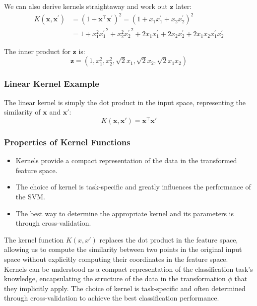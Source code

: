 We can also derive kernels straightaway and work out $\textbf{z}$ later:
\begin{align*}  K(\mathbf{x},\mathbf{x}^{\prime})& =(1+\mathbf{x}^\top\mathbf{x}^\prime)^2=(1+x_1x_1^\prime+x_2x_2^\prime)^2  \\
&=1+x_1^2{x_1^{\prime}}^2+x_2^2{x_2^{\prime}}^2+2x_1x_1^{\prime}+2x_2x_2^{\prime}+2x_1x_2x_1^{\prime}x_2^{\prime}
\end{align*}

The inner product for $\textbf{z}$ is:
\begin{equation*}
    \mathbf{z} = (1, x_1^2, x_2^2, \sqrt{2}x_1, \sqrt{2}x_2, \sqrt{2}x_1x_2)
\end{equation*}




\subsubsection*{Linear Kernel Example}
The linear kernel is simply the dot product in the input space, representing the similarity of $\mathbf{x}$ and $\mathbf{x'}$:
\begin{equation*}
    K(\mathbf{x}, \mathbf{x'}) = \mathbf{x}^\top \mathbf{x'}
\end{equation*}


\subsubsection*{Properties of Kernel Functions}

\begin{itemize}
    \item Kernels provide a compact representation of the data in the transformed feature space.
    \item The choice of kernel is task-specific and greatly influences the performance of the SVM.
    \item The best way to determine the appropriate kernel and its parameters is through cross-validation.
\end{itemize}

The kernel function \( K(x, x') \) replaces the dot product in the feature space, allowing us to compute the similarity between two points in the original input space without explicitly computing their coordinates in the feature space. \\


Kernels can be understood as a compact representation of the classification task's knowledge, encapsulating the structure of the data in the transformation \( \phi \) that they implicitly apply. The choice of kernel is task-specific and often determined through cross-validation to achieve the best classification performance.\\

